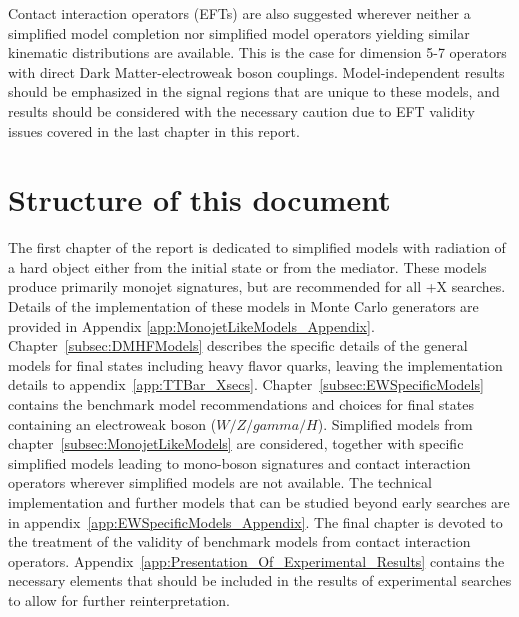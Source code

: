 Contact interaction operators (EFTs) are also suggested wherever 
neither a simplified model completion nor simplified model operators 
yielding similar kinematic distributions are available.
This is the case for dimension 5-7 operators with direct 
Dark Matter-electroweak boson couplings. 
Model-independent results should be emphasized 
in the signal regions that are unique to these models, 
and results should be considered with the necessary caution due to EFT 
validity issues covered in the last chapter in this report. 

\section{Structure of this document}

The first chapter of the report is dedicated to simplified
models with radiation of a hard object either from the initial state
or from the mediator. These models produce primarily monojet signatures, 
but are recommended for all \MET{}+X searches.
Details of the implementation of these models in
Monte Carlo generators are provided in
Appendix \ref{app:MonojetLikeModels_Appendix}.
Chapter~\ref{subsec:DMHFModels} describes the specific details of the general models
for final states including heavy flavor quarks, leaving the implementation
details to appendix~\ref{app:TTBar_Xsecs}.  
Chapter~\ref{subsec:EWSpecificModels} contains the benchmark model
recommendations and choices for final states containing an electroweak 
boson ($W/Z/gamma/H$). 
Simplified models from chapter~\ref{subsec:MonojetLikeModels}
are considered, together with specific simplified models leading to mono-boson signatures
and contact interaction operators wherever simplified models are not available. 
The technical implementation and further models that can be studied
beyond early searches are in appendix~\ref{app:EWSpecificModels_Appendix}. 
The final chapter is devoted to the treatment of the validity of benchmark
models from contact interaction operators.
Appendix~\ref{app:Presentation_Of_Experimental_Results} contains the necessary elements that
should be included in the results of experimental searches to allow for further reinterpretation. 


